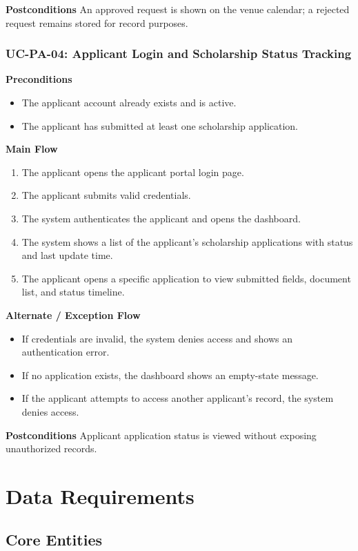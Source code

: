 \documentclass[12pt,a4paper]{article}
\begin{document}
\textbf{Postconditions}
An approved request is shown on the venue calendar; a rejected request remains stored for record purposes.

\subsubsection*{UC-PA-04: Applicant Login and Scholarship Status Tracking}

\textbf{Preconditions}
\begin{itemize}[nosep]
\item The applicant account already exists and is active.
\item The applicant has submitted at least one scholarship application.
\end{itemize}

\textbf{Main Flow}
\begin{enumerate}[nosep]
\item The applicant opens the applicant portal login page.
\item The applicant submits valid credentials.
\item The system authenticates the applicant and opens the dashboard.
\item The system shows a list of the applicant's scholarship applications with status and last update time.
\item The applicant opens a specific application to view submitted fields, document list, and status timeline.
\end{enumerate}

\textbf{Alternate / Exception Flow}
\begin{itemize}[nosep]
\item If credentials are invalid, the system denies access and shows an authentication error.
\item If no application exists, the dashboard shows an empty-state message.
\item If the applicant attempts to access another applicant's record, the system denies access.
\end{itemize}

\textbf{Postconditions}
Applicant application status is viewed without exposing unauthorized records.
\newpage
\section{Data Requirements}

\subsection{Core Entities}
\end{document}
